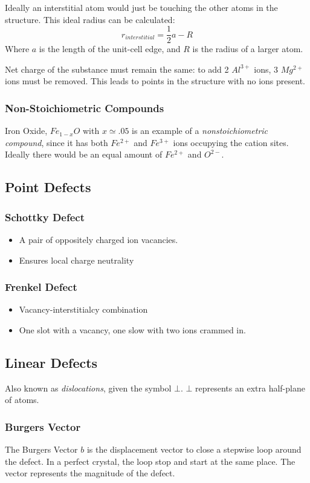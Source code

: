 \documentclass[10pt,letterpaper]{article}
\begin{document}
	Ideally an interstitial atom would just be touching the other atoms in the structure. This ideal radius can be calculated: 
	$$
	r_{interstitial} = \frac{1}{2} a - R
	$$
	Where $a$ is the length of the unit-cell edge, and $R$ is the radius of a larger atom. 
	
	Net charge of the substance must remain the same: to add 2 $Al^{3+}$ ions, 3 $Mg^{2+}$ ions must be removed. This leads to points in the structure with no ions present. 
	
	\subsubsection{Non-Stoichiometric Compounds}
	Iron Oxide, $Fe_{1-x}O$ with $x \simeq .05$ is an example of a \textit{nonstoichiometric compound}, since it has both $Fe^{2+}$ and $Fe^{3+}$ ions occupying the cation sites. Ideally there would be an equal amount of $Fe^{2+}$ and $O^{2-}$. 
	\subsection{Point Defects}
	\subsubsection{Schottky Defect}
	\begin{itemize}
		\item A pair of oppositely charged ion vacancies. 
		\item Ensures local charge neutrality
	\end{itemize}
	\subsubsection{Frenkel Defect}
	\begin{itemize}
		\item Vacancy-interstitialcy combination
		\item One slot with a vacancy, one slow with two ions crammed in.
	\end{itemize}
	\subsection{Linear Defects}
	Also known as \textit{dislocations}, given the symbol $\bot$. $\bot$ represents an extra half-plane of atoms.
	\subsubsection{Burgers Vector}
	The Burgers Vector $b$ is the displacement vector to close a stepwise loop around the defect. In a perfect crystal, the loop stop and start at the same place. The vector represents the magnitude of the defect. 
	
\end{document}

